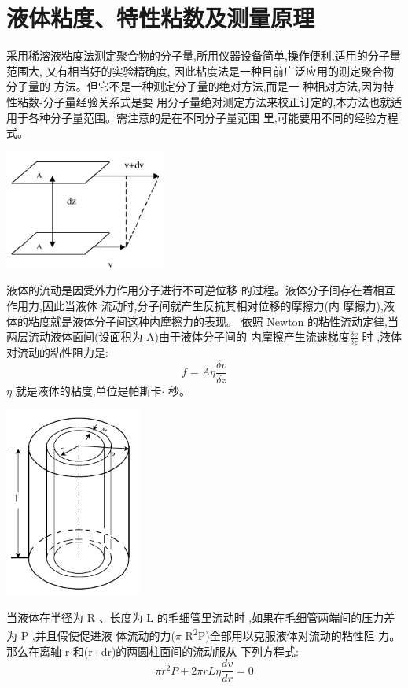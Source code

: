 \documentclass[11pt]{report}
\begin{document}
\chapter{液体粘度、特性粘数及测量原理}
\label{sec:orgd1b7e75}
   采用稀溶液粘度法测定聚合物的分子量,所用仪器设备简单,操作便利,适用的分子量
范围大, 又有相当好的实验精确度, 因此粘度法是一种目前广泛应用的测定聚合物分子量的
方法。但它不是一种测定分子量的绝对方法,而是一
种相对方法,因为特性粘数-分子量经验关系式是要
用分子量绝对测定方法来校正订定的,本方法也就适
用于各种分子量范围。需注意的是在不同分子量范围
里,可能要用不同的经验方程式。
\begin{center}
\includegraphics[width=200]{../img/1.png}
\end{center}
液体的流动是因受外力作用分子进行不可逆位移
的过程。液体分子间存在着相互作用力,因此当液体
流动时,分子间就产生反抗其相对位移的摩擦力(内
摩擦力),液体的粘度就是液体分子间这种内摩擦力的表现。
依照 Newton 的粘性流动定律,当两层流动液体面间(设面积为 A)由于液体分子间的
内摩擦产生流速梯度\(\frac{\delta v}{\delta z}\) 时
 ,液体对流动的粘性阻力是:
 \[
 f=A\eta \frac{\delta v}{\delta z}
 \]
\(\eta\) 就是液体的粘度,单位是帕斯卡\(\cdot\) 秒。
\begin{center}
\includegraphics[width=170]{../img/2.png}
\end{center}
当液体在半径为 R 、长度为 L 的毛细管里流动时 
 ,如果在毛细管两端间的压力差为 P ,并且假使促进液
体流动的力(\(\pi\) R\textsuperscript{2}P)全部用以克服液体对流动的粘性阻
力。那么在离轴 r 和(r+dr)的两圆柱面间的流动服从
下列方程式:
\[
\pi r^{2}P+2\pi rL\eta \frac{d v}{d r}=0
\]
\end{document}
